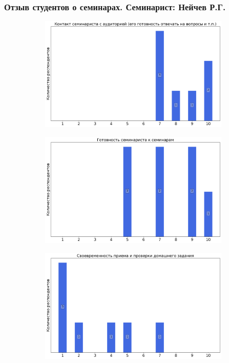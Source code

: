     \subsubsection{Отзыв студентов о семинарах. Семинарист: Нейчев Р.Г.}
		\begin{figure}[H]
			\centering
			\begin{subfigure}[b]{0.45\textwidth}
				\centering
				\includegraphics[width=\textwidth]{images/4 course/Введение в машинное обучение/seminarists-marks-Нейчев Р.Г.-0.png}
			\end{subfigure}
			\begin{subfigure}[b]{0.45\textwidth}
				\centering
				\includegraphics[width=\textwidth]{images/4 course/Введение в машинное обучение/seminarists-marks-Нейчев Р.Г.-1.png}
			\end{subfigure}
			\begin{subfigure}[b]{0.45\textwidth}
				\centering
				\includegraphics[width=\textwidth]{images/4 course/Введение в машинное обучение/seminarists-marks-Нейчев Р.Г.-2.png}

\end{subfigure}
\end{figure}
